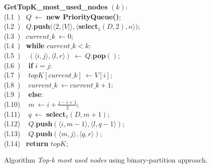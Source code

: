 \begin{itemize}[leftmargin=3mm]
\begin{itemize}
\end{itemize}


\begin{figure}[t]
	\begin{center}
		\begin{minipage}{0.70\textwidth}
			\begin{code}
				\textbf{GetTopK\_most\_used\_nodes} $(k)$: \\
				\>(l.1~) \> ~$ Q ~\leftarrow$ \textbf{new PriorityQueue()}; \\
				\>(l.2~) \> ~$ Q .$\textbf{push$(\langle2, |V|\rangle, \langle$select$_1(D,2), n\rangle)$}; \\
				\>(l.3~) \> ~$ current\_k ~\leftarrow 0$; \\%
				
				\>(l.4~) \> ~\textbf{while }$current\_k < k$: \\
				\>(l.5~) \> ~\> $ (\langle i,j\rangle, \langle l,r\rangle) ~\leftarrow ~Q.$\textbf{pop$()$}; \\%
				
				\>(l.6~) \> ~\> \textbf{if} $i = j$: \\
				\>(l.7~) \> ~\> \> $ topK[current\_k] ~\leftarrow V[i]$; \\
				\>(l.8~) \> ~\> \> $ current\_k ~\leftarrow current\_k + 1$; \\
				\>(l.9~) \> ~\> \textbf{else}: \\
				\>(l.10) \> ~\> \> $ m ~\leftarrow i + \frac{j - i + 1}{2}$; \\
				\>(l.11) \> ~\> \> $ q ~\leftarrow$ \textbf{select$_1(D,m + 1)$}; \\
				\>(l.12) \> ~\> \> $ Q .$\textbf{push$(\langle i, m-1 \rangle, \langle l, q-1 \rangle)$}; \\
				\>(l.13) \> ~\> \> $ Q .$\textbf{push$(\langle m, j \rangle, \langle q, r \rangle)$}; \\%
				\>(l.14) \> ~\textbf{return} $topK$; \\
			\end{code}
		\end{minipage}
	\end{center}
	\vspace{-0.3cm}
	\caption{Algorithm {\em Top-k most used nodes} using binary-partition approach.}
	\label{fig:topk_nieves}
\end{figure}


\end{itemize}
